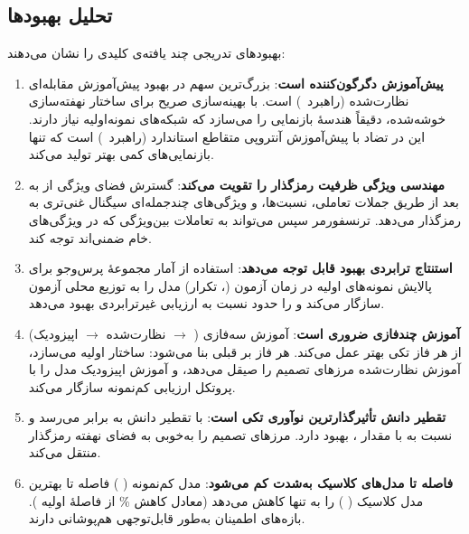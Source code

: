\subsection{تحلیل بهبودها}

بهبودهای تدریجی چند یافته‌ی کلیدی را نشان می‌دهند:

\begin{enumerate}
\item \textbf{پیش‌آموزش  دگرگون‌کننده است}: بزرگ‌ترین سهم در بهبود  پیش‌آموزش مقابله‌ای نظارت‌شده (راهبرد~) است. با بهینه‌سازی صریح برای ساختار نهفته‌سازی خوشه‌شده،  دقیقاً هندسۀ بازنمایی را می‌سازد که شبکه‌های نمونه‌اولیه نیاز دارند. این در تضاد با پیش‌آموزش آنتروپی متقاطع استاندارد (راهبرد~) است که تنها بازنمایی‌های کمی بهتر تولید می‌کند.

\item \textbf{مهندسی ویژگی ظرفیت رمزگذار را تقویت می‌کند}: گسترش فضای ویژگی از  به  بعد از طریق جملات تعاملی، نسبت‌ها، و ویژگی‌های چندجمله‌ای سیگنال غنی‌تری به رمزگذار می‌دهد. ترنسفورمر  سپس می‌تواند به تعاملات بین‌ویژگی که در ویژگی‌های خام ضمنی‌اند توجه کند.

\item \textbf{استنتاج ترابردی بهبود قابل توجه می‌دهد}: استفاده از آمار مجموعۀ پرس‌وجو برای پالایش نمونه‌های اولیه در زمان آزمون (،  تکرار) مدل را به توزیع محلی آزمون سازگار می‌کند و  را حدود  نسبت به ارزیابی غیرترابردی بهبود می‌دهد.

\item \textbf{آموزش چندفازی ضروری است}: آموزش سه‌فازی ( $\to$ نظارت‌شده $\to$ اپیزودیک) از هر فاز تکی بهتر عمل می‌کند. هر فاز بر قبلی بنا می‌شود:  ساختار اولیه می‌سازد، آموزش نظارت‌شده مرزهای تصمیم را صیقل می‌دهد، و آموزش اپیزودیک مدل را با پروتکل ارزیابی کم‌نمونه سازگار می‌کند.

\item \textbf{تقطیر دانش تأثیرگذارترین نوآوری تکی است}:  با تقطیر دانش  به  برابر  می‌رسد و نسبت به  با مقدار ، بهبود  دارد.  مرزهای تصمیم  را به‌خوبی به فضای نهفته رمزگذار منتقل می‌کند.

\item \textbf{فاصله تا مدل‌های کلاسیک به‌شدت کم می‌شود}: مدل کم‌نمونه  ( ) فاصله تا بهترین مدل کلاسیک ( ) را به تنها   کاهش می‌دهد (معادل کاهش \% از فاصلۀ اولیه ). بازه‌های اطمینان به‌طور قابل‌توجهی هم‌پوشانی دارند.


\end{enumerate}
